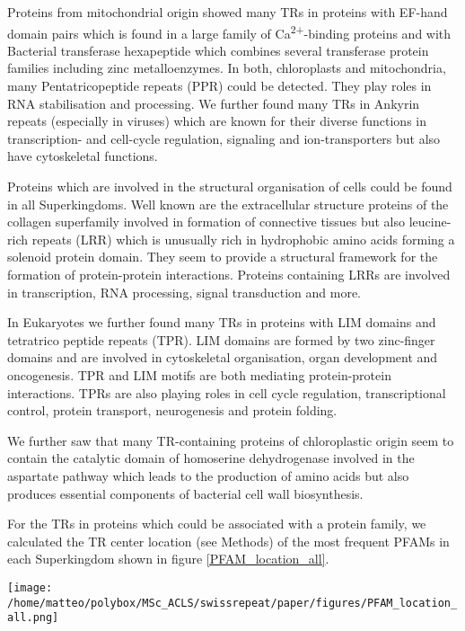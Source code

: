 \documentclass[a4,center,fleqn]{NAR}
\begin{document}
Proteins from mitochondrial origin showed many TRs in proteins with EF-hand domain pairs which is found in a large family of Ca\textsuperscript{2+}-binding proteins and with Bacterial transferase hexapeptide which combines several transferase protein families including zinc metalloenzymes.
In both, chloroplasts and mitochondria, many Pentatricopeptide repeats (PPR) could be detected. They play roles in RNA stabilisation and processing.
We further found many TRs in Ankyrin repeats (especially in viruses) which are known for their diverse functions in transcription- and cell-cycle regulation, signaling and ion-transporters but also have cytoskeletal functions.

Proteins which are involved in the structural organisation of cells could be found in all Superkingdoms. Well known are the extracellular structure proteins of the collagen superfamily involved in formation of connective tissues but also leucine-rich repeats (LRR) which is unusually rich in hydrophobic amino acids forming a solenoid protein domain. They seem to provide a structural framework for the formation of protein-protein interactions.
Proteins containing LRRs are involved in transcription, RNA processing, signal transduction and more.

In Eukaryotes we further found many TRs in proteins with LIM domains and tetratrico peptide repeats (TPR). LIM domains are formed by two zinc-finger domains and are involved in cytoskeletal organisation, organ development and oncogenesis. TPR and LIM motifs are both mediating protein-protein interactions. TPRs are also playing roles in cell cycle regulation, transcriptional control, protein transport, neurogenesis and protein folding.

We further saw that many TR-containing proteins of chloroplastic origin seem to contain the catalytic domain of homoserine dehydrogenase involved in the aspartate pathway which leads to the production of amino acids but also produces essential components of bacterial cell wall biosynthesis.

For the TRs in proteins which could be associated with a protein family, we calculated the TR center location (see Methods) of the most frequent PFAMs in each Superkingdom shown in figure \ref{PFAM_location_all}.

\begin{figure*}[t]
\begin{center}
\texttt{[image: /home/matteo/polybox/MSc\_ACLS/swissrepeat/paper/figures/PFAM\_location\_all.png]}
\end{center}
\caption{The ten PFAM with the most detected TRs for each Superkingdom are plotted according their normalized TR center location (see Methods) and number of site-specific TRs.}
\label{PFAM_location_all}
\end{figure*}
\end{document}
